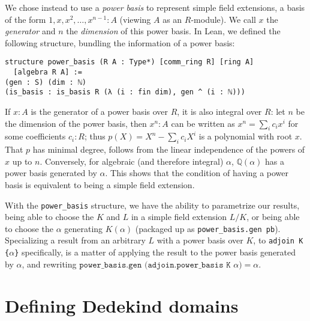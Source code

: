 \documentclass[a4paper,USenglish,cleveref, autoref, thm-restate]{lipics-v2021}
\newcommand{\lean}[1]{\texttt{#1}\xspace} %
\newcommand{\Q}{\mathbb{Q}}
\begin{document}
We chose instead to use a \emph{power basis} to represent simple field extensions, a basis of the form $1, x, x^2, \dots, x^{n-1} : A$ (viewing $A$ as an $R$-module).
We call $x$ the \emph{generator} and $n$ the \emph{dimension} of this power basis.
In Lean, we defined the following structure, bundling the information of a power basis:
\begin{lstlisting}
structure power_basis (R A : Type*) [comm_ring R] [ring A]
  [algebra R A] :=
(gen : S) (dim : ℕ)
(is_basis : is_basis R (λ (i : fin dim), gen ^ (i : ℕ)))
\end{lstlisting}

If $x : A$ is the generator of a power basis over $R$, it is also integral over $R$:
let $n$ be the dimension of the power basis, then $x^n : A$ can be written as $x^n = \sum_i c_i x^i$ for some coefficients $c_i : R$;
thus $p(X) = X^n - \sum_i c_i X^i$ is a polynomial with root $x$.
That $p$ has minimal degree, follows from the linear independence of the powers of $x$ up to $n$.
Conversely, for algebraic (and therefore integral) $\alpha$, $\Q(\alpha)$ has a power basis generated by $\alpha$.
This shows that the condition of having a power basis is equivalent to being a simple field extension.

With the \lean{power\_basis} structure, we have the ability to parametrize our results,
being able to choose the $K$ and $L$ in a simple field extension $L / K$,
or being able to choose the $\alpha$ generating $K(\alpha)$ (packaged up as \lean{power\_basis.gen\ pb}).
Specializing a result from an arbitrary $L$ with a power basis over $K$, to \lean{adjoin K \{$\alpha$\}} specifically, is a matter of applying the result to the power basis generated by $\alpha$, and rewriting $\lean{power\_basis.gen (adjoin.power\_basis K $\alpha$)} = \alpha$.


\section{Defining Dedekind domains} \label{sec:Dedekind-domain}
\end{document}
